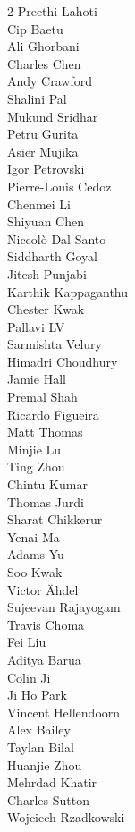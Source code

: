 \begin{multicols}{2}
Preethi Lahoti \\
Cip Baetu \\
Ali Ghorbani \\
Charles Chen \\
Andy Crawford \\
Shalini Pal \\
Mukund Sridhar \\
Petru Gurita \\
Asier Mujika \\
Igor Petrovski \\
Pierre-Louis Cedoz \\
Chenmei Li \\
Shiyuan Chen \\
Niccolò Dal Santo \\
Siddharth Goyal \\
Jitesh Punjabi \\
Karthik Kappaganthu \\
Chester Kwak \\
Pallavi LV \\
Sarmishta Velury \\
Himadri Choudhury \\
Jamie Hall \\
Premal Shah \\
Ricardo Figueira \\
Matt Thomas \\
Minjie Lu \\
Ting Zhou \\
Chintu Kumar \\
Thomas Jurdi \\
Sharat Chikkerur \\
Yenai Ma \\
Adams Yu \\
Soo Kwak \\
Victor Ähdel \\
Sujeevan Rajayogam \\
Travis Choma \\
Fei Liu \\
Aditya Barua \\
Colin Ji \\
Ji Ho Park \\
Vincent Hellendoorn \\
Alex Bailey \\
Taylan Bilal \\
Huanjie Zhou \\
Mehrdad Khatir \\
Charles Sutton \\
Wojciech Rzadkowski \\

\end{multicols}
